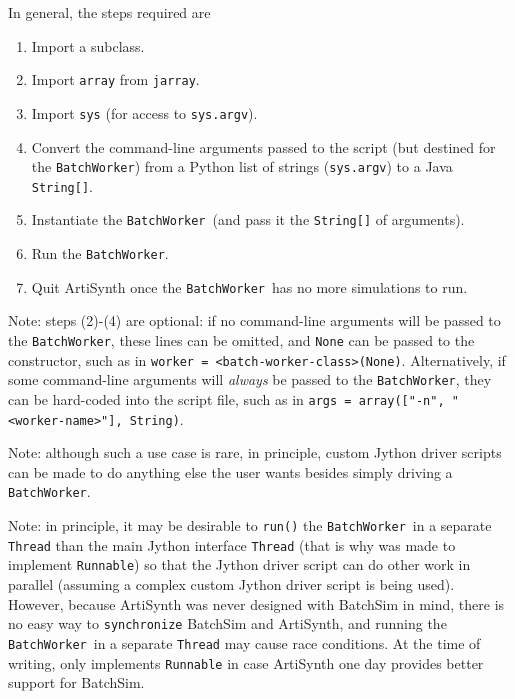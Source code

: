 \documentclass{article}
\newcommand{\BW}{{\tt BatchWorker}}
\begin{document}
In general, the steps required are

\begin{enumerate}

\item Import a  subclass.
\item Import {\tt array} from {\tt jarray}.
\item Import {\tt sys} (for access to {\tt sys.argv}).
\item Convert the command-line arguments passed to the script (but destined for the \BW) from a Python list of strings ({\tt sys.argv}) to a Java {\tt String[]}.
\item Instantiate the \BW\ (and pass it the {\tt String[]} of arguments).
\item Run the \BW.
\item Quit ArtiSynth once the \BW\ has no more simulations to run.

\end{enumerate}

\begin{sideblock}
Note: steps (2)-(4) are optional: if no command-line arguments will be passed to the \BW, these lines can be omitted, and {\tt None} can be passed to the constructor, such as in {\tt worker = <batch-worker-class>(None)}. Alternatively, if some command-line arguments will \textit{always} be passed to the \BW, they can be hard-coded into the script file, such as in {\tt args = array(["-n", "<worker-name>"], String)}.
\end{sideblock}

\begin{sideblock}
Note: although such a use case is rare, in principle, custom Jython driver scripts can be made to do anything else the user wants besides simply driving a \BW.
\end{sideblock}

\begin{sideblock}
Note: in principle, it may be desirable to {\tt run()} the \BW\ in a separate {\tt Thread} than the main Jython interface {\tt Thread} (that is why  was made to implement {\tt Runnable}) so that the Jython driver script can do other work in parallel (assuming a complex custom Jython driver script is being used). However, because ArtiSynth was never designed with BatchSim in mind, there is no easy way to {\tt synchronize} BatchSim and ArtiSynth, and running the \BW\ in a separate {\tt Thread} may cause race conditions. At the time of writing,  only implements {\tt Runnable} in case ArtiSynth one day provides better support for BatchSim.
\end{sideblock}
\end{document}
